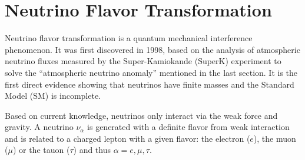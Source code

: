 \section{Neutrino Flavor Transformation}
Neutrino flavor transformation is a quantum mechanical interference phenomenon\cite{akhmedov2019quantum}. It was first discovered in 1998, based on the analysis of atmospheric neutrino fluxes measured by the Super-Kamiokande (SuperK) experiment to solve the ``atmospheric neutrino anomaly'' mentioned in the last section\cite{fukuda1998evidence}. It is the first direct evidence showing that neutrinos have finite masses and the Standard Model (SM) is incomplete.

Based on current knowledge, neutrinos only interact via the weak force and gravity. A neutrino $\nu_\alpha$ is generated with a definite flavor from weak interaction and is related to a charged lepton with a given flavor: the electron ($e$), the muon ($\mu$) or the tauon ($\tau$) and thus $\alpha=e,\mu,\tau$.

